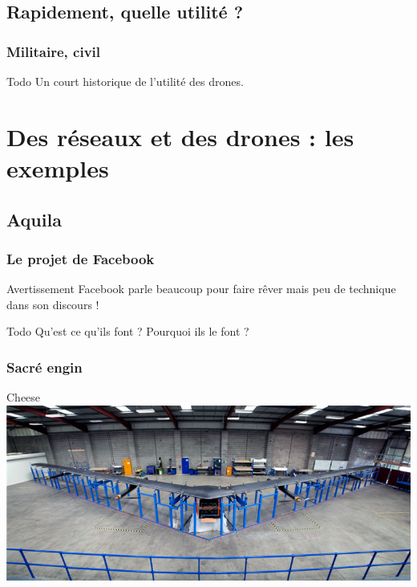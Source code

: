\documentclass{beamer}
\begin{document}
\subsection{Rapidement, quelle utilité ?}
\begin{frame}
  \frametitle{Militaire, civil}
  \begin{block}{Todo}
    Un court historique de l'utilité des drones.
  \end{block}
\end{frame}

\section{Des réseaux et des drones : les exemples}
\begin{frame}
	\tableofcontents[currentsection]
\end{frame}

\subsection{Aquila}
\begin{frame}
  \frametitle{Le projet de Facebook}
  \begin{alertblock}{Avertissement}
    Facebook parle beaucoup pour faire rêver mais peu de technique dans son discours !
  \end{alertblock}
  \begin{block}{Todo}
    Qu'est ce qu'ils font ? Pourquoi ils le font ?
  \end{block}
\end{frame}

\begin{frame}
  \frametitle{Sacré engin}
  \begin{block}{Cheese}
      \includegraphics[width=\textwidth]{../Images/facebook_aquila.png}
  \end{block}
\end{frame}
\end{document}
